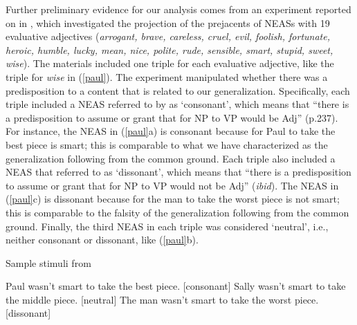 \documentclass[11pt,fleqn]{article}
\newcommand{\6}{\mbox{$[\hspace*{-.6mm}[$}}
\newcommand{\9}{\mbox{$]\hspace*{-.6mm}]$}}
\begin{document}
Further preliminary evidence for our analysis comes from an experiment reported on in \citealt{karttunen-etal2014}, which investigated the projection of the prejacents of NEASs with 19 evaluative adjectives ({\em arrogant, brave, careless, cruel, evil, foolish, fortunate, heroic, humble, lucky, mean, nice, polite, rude, sensible, smart, stupid, sweet, wise}). The materials included one triple for each evaluative adjective, like the triple for {\em wise} in (\ref{paul}). The experiment manipulated whether there was a predisposition to a content that is related to our generalization. Specifically, each triple included a NEAS referred to by \citet{karttunen-etal2014} as `consonant', which means that ``there is a predisposition to assume or grant that for NP to VP would be Adj'' (p.237). For instance, the NEAS in (\ref{paul}a) is consonant because for Paul to take the best piece is smart; this is comparable to what we have characterized as the generalization following from the common ground. Each triple also included a NEAS that \citet{karttunen-etal2014} referred to as `dissonant', which means that ``there is a predisposition to assume or grant that for NP to VP would not be Adj'' ({\em ibid}). The NEAS in (\ref{paul}c) is dissonant because for the man to take the worst piece is not smart; this is comparable to the falsity of the generalization following from the common ground. Finally, the third NEAS in each triple was considered `neutral', i.e., neither consonant or dissonant, like (\ref{paul}b).

\begin{exe}
\ex\label{paul} Sample stimuli from \citealt[241]{karttunen-etal2014}
\begin{xlist}
\ex Paul wasn't smart to take the best piece. \hfill [consonant]
\ex Sally wasn't smart to take the middle piece.  \hfill [neutral]
\ex The man wasn't smart to take the worst piece. \hfill [dissonant]
\end{xlist}
\end{exe}
\end{document}
